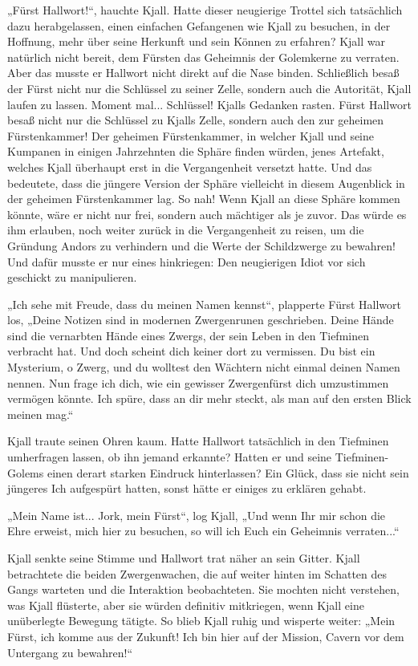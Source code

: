 „Fürst Hallwort!“, hauchte Kjall. Hatte dieser neugierige Trottel sich tatsächlich dazu herabgelassen, einen einfachen Gefangenen wie Kjall zu besuchen, in der Hoffnung, mehr über seine Herkunft und sein Können zu erfahren? Kjall war natürlich nicht bereit, dem Fürsten das Geheimnis der Golemkerne zu verraten. Aber das musste er Hallwort nicht direkt auf die Nase binden. Schließlich besaß der Fürst nicht nur die Schlüssel zu seiner Zelle, sondern auch die Autorität, Kjall laufen zu lassen. Moment mal... Schlüssel! Kjalls Gedanken rasten. Fürst Hallwort besaß nicht nur die Schlüssel zu Kjalls Zelle, sondern auch den zur geheimen Fürstenkammer! Der geheimen Fürstenkammer, in welcher Kjall und seine Kumpanen in einigen Jahrzehnten die Sphäre finden würden, jenes Artefakt, welches Kjall überhaupt erst in die Vergangenheit versetzt hatte. Und das bedeutete, dass die jüngere Version der Sphäre vielleicht in diesem Augenblick in der geheimen Fürstenkammer lag. So nah! Wenn Kjall an diese Sphäre kommen könnte, wäre er nicht nur frei, sondern auch mächtiger als je zuvor. Das würde es ihm erlauben, noch weiter zurück in die Vergangenheit zu reisen, um die Gründung Andors zu verhindern und die Werte der Schildzwerge zu bewahren! Und dafür musste er nur eines hinkriegen: Den neugierigen Idiot vor sich geschickt zu manipulieren.

„Ich sehe mit Freude, dass du meinen Namen kennst“, plapperte Fürst Hallwort los, „Deine Notizen sind in modernen Zwergenrunen geschrieben. Deine Hände sind die vernarbten Hände eines Zwergs, der sein Leben in den Tiefminen verbracht hat. Und doch scheint dich keiner dort zu vermissen. Du bist ein Mysterium, o Zwerg, und du wolltest den Wächtern nicht einmal deinen Namen nennen. Nun frage ich dich, wie ein gewisser Zwergenfürst dich umzustimmen vermögen könnte. Ich spüre, dass an dir mehr steckt, als man auf den ersten Blick meinen mag.“

Kjall traute seinen Ohren kaum. Hatte Hallwort tatsächlich in den Tiefminen umherfragen lassen, ob ihn jemand erkannte? Hatten er und seine Tiefminen-Golems einen derart starken Eindruck hinterlassen? Ein Glück, dass sie nicht sein jüngeres Ich aufgespürt hatten, sonst hätte er einiges zu erklären gehabt.

„Mein Name ist... Jork, mein Fürst“, log Kjall, „Und wenn Ihr mir schon die Ehre erweist, mich hier zu besuchen, so will ich Euch ein Geheimnis verraten...“

Kjall senkte seine Stimme und Hallwort trat näher an sein Gitter. Kjall betrachtete die beiden Zwergenwachen, die auf weiter hinten im Schatten des Gangs warteten und die Interaktion beobachteten. Sie mochten nicht verstehen, was Kjall flüsterte, aber sie würden definitiv mitkriegen, wenn Kjall eine unüberlegte Bewegung tätigte. So blieb Kjall ruhig und wisperte weiter: „Mein Fürst, ich komme aus der Zukunft! Ich bin hier auf der Mission, Cavern vor dem Untergang zu bewahren!“

